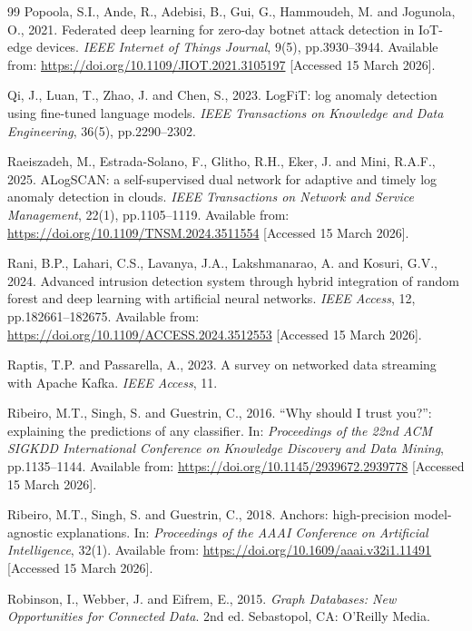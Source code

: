 \documentclass[12pt,a4paper]{report}
\begin{document}
\begin{thebibliography}{99}
Popoola, S.I., Ande, R., Adebisi, B., Gui, G., Hammoudeh, M. and Jogunola, O., 2021. Federated deep learning for zero-day botnet attack detection in IoT-edge devices. \textit{IEEE Internet of Things Journal}, 9(5), pp.3930--3944. Available from: \url{https://doi.org/10.1109/JIOT.2021.3105197} [Accessed 15 March 2026].

Qi, J., Luan, T., Zhao, J. and Chen, S., 2023. LogFiT: log anomaly detection using fine-tuned language models. \textit{IEEE Transactions on Knowledge and Data Engineering}, 36(5), pp.2290--2302.

Raeiszadeh, M., Estrada-Solano, F., Glitho, R.H., Eker, J. and Mini, R.A.F., 2025. ALogSCAN: a self-supervised dual network for adaptive and timely log anomaly detection in clouds. \textit{IEEE Transactions on Network and Service Management}, 22(1), pp.1105--1119. Available from: \url{https://doi.org/10.1109/TNSM.2024.3511554} [Accessed 15 March 2026].

Rani, B.P., Lahari, C.S., Lavanya, J.A., Lakshmanarao, A. and Kosuri, G.V., 2024. Advanced intrusion detection system through hybrid integration of random forest and deep learning with artificial neural networks. \textit{IEEE Access}, 12, pp.182661--182675. Available from: \url{https://doi.org/10.1109/ACCESS.2024.3512553} [Accessed 15 March 2026].

Raptis, T.P. and Passarella, A., 2023. A survey on networked data streaming with Apache Kafka. \textit{IEEE Access}, 11.

Ribeiro, M.T., Singh, S. and Guestrin, C., 2016. ``Why should I trust you?'': explaining the predictions of any classifier. In: \textit{Proceedings of the 22nd ACM SIGKDD International Conference on Knowledge Discovery and Data Mining}, pp.1135--1144. Available from: \url{https://doi.org/10.1145/2939672.2939778} [Accessed 15 March 2026].

Ribeiro, M.T., Singh, S. and Guestrin, C., 2018. Anchors: high-precision model-agnostic explanations. In: \textit{Proceedings of the AAAI Conference on Artificial Intelligence}, 32(1). Available from: \url{https://doi.org/10.1609/aaai.v32i1.11491} [Accessed 15 March 2026].

Robinson, I., Webber, J. and Eifrem, E., 2015. \textit{Graph Databases: New Opportunities for Connected Data}. 2nd ed. Sebastopol, CA: O'Reilly Media.


\end{thebibliography}
\end{document}
